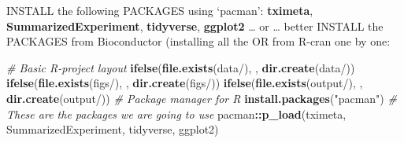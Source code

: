 \documentclass[
]{article}
\newenvironment{Shaded}{\begin{snugshade}}{\end{snugshade}}
\newcommand{\CommentTok}[1]{\textcolor[rgb]{0.56,0.35,0.01}{\textit{#1}}}
\newcommand{\FunctionTok}[1]{\textcolor[rgb]{0.13,0.29,0.53}{\textbf{#1}}}
\newcommand{\NormalTok}[1]{#1}
\newcommand{\SpecialCharTok}[1]{\textcolor[rgb]{0.81,0.36,0.00}{\textbf{#1}}}
\newcommand{\StringTok}[1]{\textcolor[rgb]{0.31,0.60,0.02}{#1}}
\begin{document}
INSTALL the following PACKAGES using `pacman': \textbf{tximeta},
\textbf{SummarizedExperiment}, \textbf{tidyverse}, \textbf{ggplot2}
\ldots{} or \ldots{} better INSTALL the PACKAGES from Bioconductor
(installing all the OR from R-cran one by one:

\begin{Shaded}
\begin{Highlighting}[]
\CommentTok{\# Basic R{-}project layout}
\FunctionTok{ifelse}\NormalTok{(}\FunctionTok{file.exists}\NormalTok{(}\StringTok{\textquotesingle{}data/\textquotesingle{}}\NormalTok{), }\StringTok{\textquotesingle{}\textquotesingle{}}\NormalTok{, }\FunctionTok{dir.create}\NormalTok{(}\StringTok{\textquotesingle{}data/\textquotesingle{}}\NormalTok{))}
\FunctionTok{ifelse}\NormalTok{(}\FunctionTok{file.exists}\NormalTok{(}\StringTok{\textquotesingle{}figs/\textquotesingle{}}\NormalTok{), }\StringTok{\textquotesingle{}\textquotesingle{}}\NormalTok{, }\FunctionTok{dir.create}\NormalTok{(}\StringTok{\textquotesingle{}figs/\textquotesingle{}}\NormalTok{))}
\FunctionTok{ifelse}\NormalTok{(}\FunctionTok{file.exists}\NormalTok{(}\StringTok{\textquotesingle{}output/\textquotesingle{}}\NormalTok{), }\StringTok{\textquotesingle{}\textquotesingle{}}\NormalTok{, }\FunctionTok{dir.create}\NormalTok{(}\StringTok{\textquotesingle{}output/\textquotesingle{}}\NormalTok{))}
\CommentTok{\# Package manager for R}
\FunctionTok{install.packages}\NormalTok{(}\StringTok{"pacman"}\NormalTok{)}
\CommentTok{\# These are the packages we are going to use}
\NormalTok{pacman}\SpecialCharTok{::}\FunctionTok{p\_load}\NormalTok{(tximeta, SummarizedExperiment, tidyverse, ggplot2)}
\end{Highlighting}
\end{Shaded}
\end{document}
